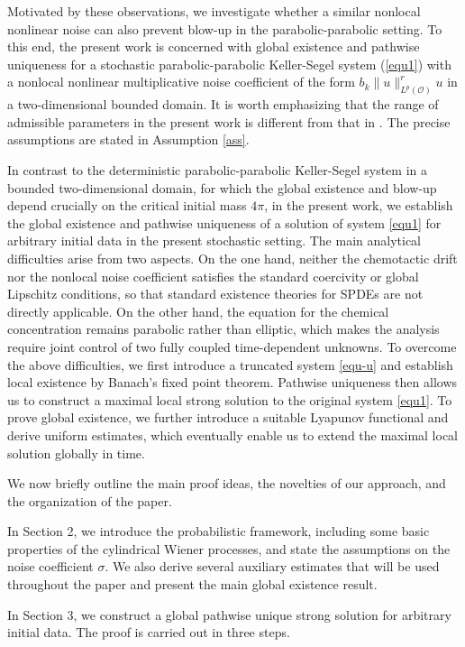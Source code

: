 \documentclass[reqno, 11pt]{amsart}
\theoremstyle{definition}
\numberwithin{equation}{section} \numberwithin{lem}{section}
\numberwithin{thm}{section} \numberwithin{prop}{section}
\numberwithin{cor}{section} \numberwithin{rem}{section}
\numberwithin{defn}{section}
\begin{document}
Motivated by these observations, we investigate whether a similar nonlocal nonlinear noise can also prevent blow-up in the parabolic-parabolic setting. To this end, the present work is concerned with global existence and pathwise uniqueness for a stochastic parabolic-parabolic Keller-Segel system (\ref{equ1}) with a nonlocal nonlinear multiplicative noise coefficient of the form
$b_k\|u\|_{L^p(\mathcal O)}^r u$ in a two-dimensional bounded domain. It is worth emphasizing that the range of admissible parameters in the present work is different from that in \cite{chen2025well}.  The precise assumptions are stated in Assumption \ref{ass}. 

 In contrast to the deterministic parabolic-parabolic Keller-Segel system in a bounded  two-dimensional domain, for which the  global existence and blow-up  depend crucially on the critical initial mass $4\pi$, in the present work,  we establish the global existence and pathwise uniqueness of a solution of system \eqref{equ1} for arbitrary initial data in the present stochastic setting.  The main analytical difficulties arise from two aspects.  On the one hand, neither the chemotactic drift nor the nonlocal noise coefficient  satisfies the standard coercivity  or global Lipschitz conditions, so that standard existence theories for SPDEs are not directly applicable. On the other hand, the equation for the chemical concentration remains parabolic rather than elliptic, which makes the analysis require joint control of two fully coupled time-dependent unknowns.
 To overcome the above difficulties, we first introduce a truncated system \eqref{equ-u} and establish local existence by Banach's fixed point theorem. Pathwise uniqueness then allows us to construct a maximal local strong solution to the original system \eqref{equ1}. To prove global existence, we further introduce a suitable Lyapunov functional and derive uniform estimates, which eventually enable us to extend the maximal local solution globally in time.

We now briefly outline the main proof ideas, the novelties of our approach, and the organization of the paper.

In Section 2, we introduce the probabilistic framework, including some basic properties of the cylindrical Wiener processes, and state the assumptions on the noise coefficient $\sigma$. We also derive several auxiliary estimates that will be used throughout the paper and present the main global existence result.

In Section 3, we construct a global pathwise unique strong solution for arbitrary initial data. The proof is carried out in three steps.
\end{document}
